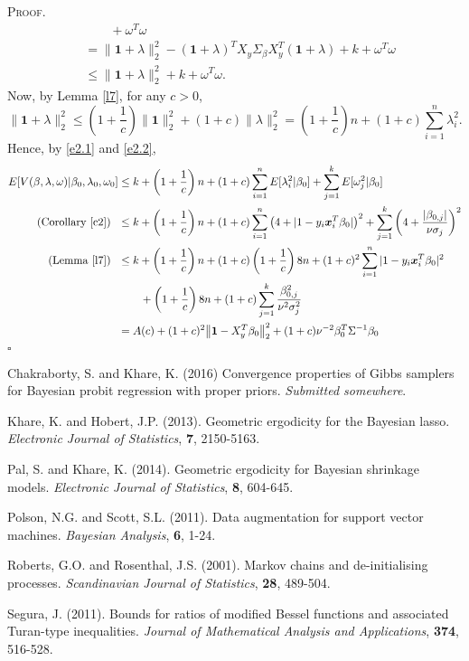 \documentclass[12pt]{article}
\newcounter{ProofCounter}
\newenvironment{Proof}{\stepcounter{ProofCounter}\textsc{Proof.}}{\hfill$\square$}
\numberwithin{equation}{section}
\begin{document}
\begin{Proof}
\begin{align}
      & \qquad + \omega^T \omega \nonumber\\
      & = \big\| \bm{1} + \lambda\big\|_2^2 - (\bm{1} + \lambda)^T X_y \Sigma_{\beta} X_y^T (\bm{1} + \lambda) + k + \omega^T \omega \nonumber\\
      & \leq \big\| \bm{1} + \lambda\big\|_2^2 + k + \omega^T \omega. 
      \label{e2.2}
  \end{align}
  Now, by Lemma \ref{l7}, for any $c > 0$,
  \[
    \big\| \bm{1} + \lambda \big\|_2^2 \leq \left( 1 + \frac{1}{c} \right)\|\bm{1}\|_2^2 + (1 + c)\|\lambda\|_2^2 = \left( 1 + \frac{1}{c} \right)n +
    (1 + c) \sum_{i=1}^{n}\lambda_i^2.
  \]
  Hence, by \eqref{e2.1} and \eqref{e2.2},
  \begin{align*}
    E[ V(\beta, \lambda, \omega) | \beta_0, \lambda_0, \omega_0] & \leq k + \left( 1 + \frac{1}{c} \right)n + (1 + c) \sum_{i=1}^{n}E[\lambda_i^2 |
    \beta_0] + \sum_{j=1}^{k} E[\omega_j^2 | \beta_0] \\
    \text{(Corollary \ref{c2}) } \ & \leq k + \left( 1 + \frac{1}{c} \right)n + (1 + c) \sum_{i=1}^{n}\left( 4 + |1 - y_i \bm{x}_i^T \beta_0| \right)^2 + 
    \sum_{j=1}^{k} \left( 4 + \frac{|\beta_{0,j}|}{\nu \sigma_j} \right)^2 \\
    \text{(Lemma \ref{l7}) } \ & \leq k + \left( 1 + \frac{1}{c} \right)n + (1 + c)\left(1 + \frac{1}{c}\right) 8n + (1+c)^2\sum_{i=1}^{n}|1 -
    y_i\bm{x}_i^T\beta_0|^2 \\
    & \qquad + \left( 1 + \frac{1}{c} \right)8n + (1 + c)\sum_{j=1}^{k} \frac{\beta_{0,j}^2}{\nu^2\sigma_j^2} \\
    & = A(c) + (1 + c)^2 \big\| \bm{1} - X_y^T \beta_0 \big\|_2^2 + (1 + c) \nu^{-2} \beta_0^T \Sigma^{-1} \beta_0
  \end{align*}
\end{Proof}


\newpage

\begin{thebibliography}{9}
    Chakraborty, S. and Khare, K. (2016) Convergence properties of Gibbs samplers for Bayesian probit regression with proper priors.
    \emph{Submitted somewhere}.

    Khare, K. and Hobert, J.P. (2013). Geometric ergodicity for the Bayesian lasso. \emph{Electronic Journal of Statistics}, \textbf{7}, 2150-5163.

    Pal, S. and Khare, K. (2014). Geometric ergodicity for Bayesian shrinkage models. \emph{Electronic Journal of Statistics}, \textbf{8}, 604-645.

    Polson, N.G. and Scott, S.L. (2011). Data augmentation for support vector machines. \emph{Bayesian Analysis}, \textbf{6}, 1-24.

    Roberts, G.O. and Rosenthal, J.S. (2001). Markov chains and de-initialising processes. \emph{Scandinavian Journal of Statistics}, \textbf{28},
    489-504.

    Segura, J. (2011). Bounds for ratios of modified Bessel functions and associated Turan-type inequalities. \emph{Journal of Mathematical Analysis
    and Applications}, \textbf{374}, 516-528.
\end{thebibliography}
\end{document}
